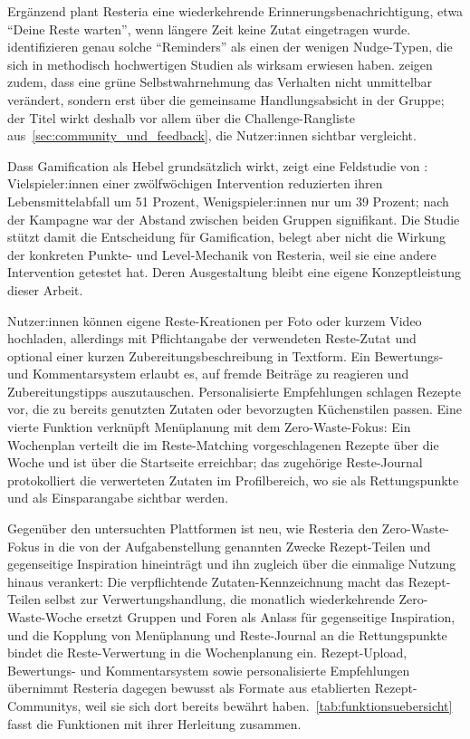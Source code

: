 Ergänzend plant Resteria eine wiederkehrende Erinnerungsbenachrichtigung, etwa \enquote{Deine Reste warten}, wenn längere Zeit keine Zutat eingetragen wurde. \textcite[S. 10]{barkerWhatNudgeTechniques2021} identifizieren genau solche \enquote{Reminders} als einen der wenigen Nudge-Typen, die sich in methodisch hochwertigen Studien als wirksam erwiesen haben. \textcite[S. 14]{nivedhithaHowGreenSocial2024} zeigen zudem, dass eine grüne Selbstwahrnehmung das Verhalten nicht unmittelbar verändert, sondern erst über die gemeinsame Handlungsabsicht in der Gruppe; der Titel wirkt deshalb vor allem über die Challenge-Rangliste aus~\autoref{sec:community_und_feedback}, die Nutzer:innen sichtbar vergleicht.

Dass Gamification als Hebel grundsätzlich wirkt, zeigt eine Feldstudie von \textcite[S. 9]{somaFoodWasteReduction2020}: Vielspieler:innen einer zwölfwöchigen Intervention reduzierten ihren Lebensmittelabfall um 51 Prozent, Wenigspieler:innen nur um 39 Prozent; nach der Kampagne war der Abstand zwischen beiden Gruppen signifikant. Die Studie stützt damit die Entscheidung für Gamification, belegt aber nicht die Wirkung der konkreten Punkte- und Level-Mechanik von Resteria, weil sie eine andere Intervention getestet hat. Deren Ausgestaltung bleibt eine eigene Konzeptleistung dieser Arbeit.

Nutzer:innen können eigene Reste-Kreationen per Foto oder kurzem Video hochladen, allerdings mit Pflichtangabe der verwendeten Reste-Zutat und optional einer kurzen Zubereitungsbeschreibung in Textform. Ein Bewertungs- und Kommentarsystem erlaubt es, auf fremde Beiträge zu reagieren und Zubereitungstipps auszutauschen. Personalisierte Empfehlungen schlagen Rezepte vor, die zu bereits genutzten Zutaten oder bevorzugten Küchenstilen passen. Eine vierte Funktion verknüpft Menüplanung mit dem Zero-Waste-Fokus: Ein Wochenplan verteilt die im Reste-Matching vorgeschlagenen Rezepte über die Woche und ist über die Startseite erreichbar; das zugehörige Reste-Journal protokolliert die verwerteten Zutaten im Profilbereich, wo sie als Rettungspunkte und als Einsparangabe sichtbar werden.

Gegenüber den untersuchten Plattformen ist neu, wie Resteria den Zero-Waste-Fokus in die von der Aufgabenstellung genannten Zwecke Rezept-Teilen und gegenseitige Inspiration hineinträgt und ihn zugleich über die einmalige Nutzung hinaus verankert: Die verpflichtende Zutaten-Kennzeichnung macht das Rezept-Teilen selbst zur Verwertungshandlung, die monatlich wiederkehrende Zero-Waste-Woche ersetzt Gruppen und Foren als Anlass für gegenseitige Inspiration, und die Kopplung von Menüplanung und Reste-Journal an die Rettungspunkte bindet die Reste-Verwertung in die Wochenplanung ein. Rezept-Upload, Bewertungs- und Kommentarsystem sowie personalisierte Empfehlungen übernimmt Resteria dagegen bewusst als Formate aus etablierten Rezept-Communitys, weil sie sich dort bereits bewährt haben.~\autoref{tab:funktionsuebersicht} fasst die Funktionen mit ihrer Herleitung zusammen.

